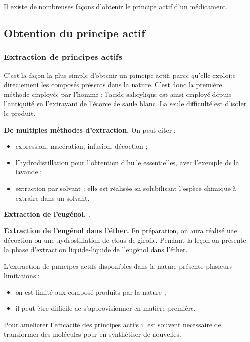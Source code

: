 \begin{transition}
Il existe de nombreuses façons d'obtenir le principe actif d'un médicament.
\end{transition}

\subsection{Obtention du principe actif}

\subsubsection{Extraction de principes actifs}

C'est la façon la plus simple d'obtenir un principe actif, parce qu'elle exploite directement les composés présents dans la nature.
C'est donc la première méthode employée par l'homme : l'acide salicylique est ainsi employé depuis l'antiquité en l'extrayant de l'écorce de saule blanc.
La seule difficulté est d'isoler le produit.
\begin{slide}
\textbf{De multiples méthodes d'extraction.}
On peut citer :
\begin{itemize}
\item expression, macération, infusion, décoction ;
\item l'hydrodistillation pour l'obtention d'huile essentielles, avec l'exemple de la lavande ;
\item extraction par solvant \cite{Prevost2017} : elle est réalisée en solubilisant l'espèce chimique à extraire dans un solvant. 
\end{itemize}
\end{slide}

\begin{slide}
\textbf{Extraction de l'eugénol.}
\cite{Prevost2017}.
\end{slide}

\begin{experience}
\textbf{Extraction de l'eugénol dans l'éther.}
En préparation, on aura réalisé une décoction ou une hydrostillation de clous de girofle.
Pendant la leçon on présente la phase d'extraction liquide-liquide de l'eugénol dans l'éther.
\end{experience}

\begin{transition}
L'extraction de principes actifs disponibles dans la nature présente plusieurs limitations :
\begin{itemize}
\item on est limité aux composé produits par la nature ;
\item il peut être difficile de s'approvisionner en matière première.
\end{itemize}
Pour améliorer l'efficacité des principes actifs il est souvent nécessaire de transformer des molécules pour en synthétiser de nouvelles.
\end{transition}

